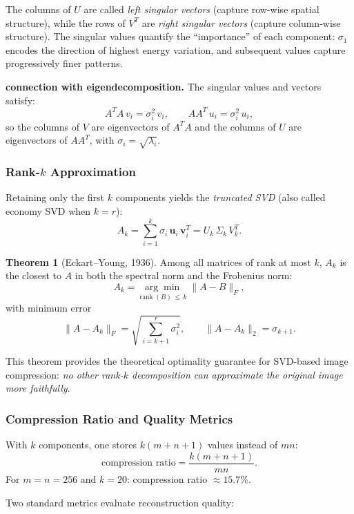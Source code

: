 \documentclass[11pt,a4paper]{article}
\theoremstyle{definition}
\newtheorem{theorem}{Theorem}
\begin{document}
\noindent The columns of $U$ are called \emph{left singular vectors} (capture row-wise spatial
structure), while the rows of $V^T$ are \emph{right singular vectors} (capture column-wise
structure). The singular values quantify the ``importance'' of each component:
$\sigma_1$ encodes the direction of highest energy variation, and subsequent values
capture progressively finer patterns.

\medskip
\noindent\textbf{connection with eigendecomposition.}
The singular values and vectors satisfy:
\[
  A^T A \,v_i = \sigma_i^2\, v_i, \qquad
  A A^T \,u_i = \sigma_i^2\, u_i,
\]
so the columns of $V$ are eigenvectors of $A^TA$ and the columns of $U$ are
eigenvectors of $AA^T$, with $\sigma_i = \sqrt{\lambda_i}$.

\subsubsection{Rank-$k$ Approximation}

Retaining only the first $k$ components yields the \emph{truncated SVD}
(also called economy SVD when $k = r$):
\[
  A_k = \sum_{i=1}^{k} \sigma_i\, \mathbf{u}_i\, \mathbf{v}_i^T
        = U_k\, \Sigma_k\, V_k^T.
\]

\begin{theorem}[Eckart--Young, 1936]
  Among all matrices of rank at most $k$, $A_k$ is the closest to $A$ in both
  the spectral norm and the Frobenius norm:
  \[
    A_k = \underset{\operatorname{rank}(B)\,\leq\,k}{\arg\min}\;\|A - B\|_F,
  \]
  with minimum error
  \[
    \|A - A_k\|_F = \sqrt{\sum_{i=k+1}^{r} \sigma_i^2},
    \qquad
    \|A - A_k\|_2 = \sigma_{k+1}.
  \]
\end{theorem}

\noindent This theorem provides the theoretical optimality guarantee for SVD-based
image compression: \emph{no other rank-$k$ decomposition can approximate the
original image more faithfully}.

\subsubsection{Compression Ratio and Quality Metrics}

With $k$ components, one stores $k(m+n+1)$ values instead of $mn$:
\[
  \text{compression ratio} = \frac{k(m+n+1)}{mn}.
\]
For $m = n = 256$ and $k = 20$: compression ratio $\approx 15.7\%$.

\medskip
\noindent Two standard metrics evaluate reconstruction quality:
\end{document}
